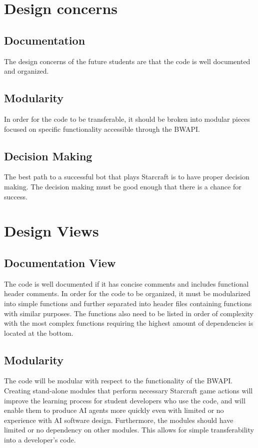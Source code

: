 \documentclass[10pt,letterpaper,onecolumn,draftclsnofoot]{IEEEtran}
\begin{document}
\section{Design concerns}
\subsection{Documentation}
	The design concerns of the future students are that the code is well documented and organized. 
\subsection{Modularity}
	In order for the code to be transferable, it should be broken into modular pieces focused on specific functionality accessible through the BWAPI.
\subsection{Decision Making}
	The best path to a successful bot that plays Starcraft is to have proper decision making. The decision making must be good enough that there is a chance for success.
	
\section{Design Views}
\subsection{Documentation View}
	The code is well documented if it has concise comments and includes functional header comments. In order for the code to be organized, it must be modularized into simple functions and further separated into header files containing functions with similar purposes. The functions also need to be listed in order of complexity with the most complex functions requiring the highest amount of dependencies is located at the bottom.
\subsection{Modularity}
	The code will be modular with respect to the functionality of the BWAPI. Creating stand-alone modules that perform necessary Starcraft game actions will improve the learning process for student developers who use the code, and will enable them to produce AI agents more quickly even with limited or no experience with AI software design. Furthermore, the modules should have limited or no dependency on other modules. This allows for simple transferability into a developer's code. 
\end{document}
